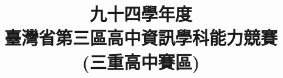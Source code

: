 \documentclass[12pt,a4paper]{report}
\begin{document}
\begin{CJK}{UTF8}{bkai}

\renewcommand{\figurename}{圖}
\renewcommand{\tablename}{表}
\renewcommand{\contentsname}{目~錄~}
\renewcommand{\listfigurename}{插~圖~目~錄}
\renewcommand{\listtablename}{表~格~目~錄}
\renewcommand{\appendixname}{附~錄}
\renewcommand{\bibname}{參~考~文~獻}     %
\renewcommand{\indexname}{索~引}
\renewcommand{\today}{\number\year~年~\number\month~月~\number\day~日}

\title{九十四學年度\\臺灣省第三區高中資訊學科能力競賽\\(三重高中賽區)}
\date{}
\maketitle


\end{CJK}
\end{document}

